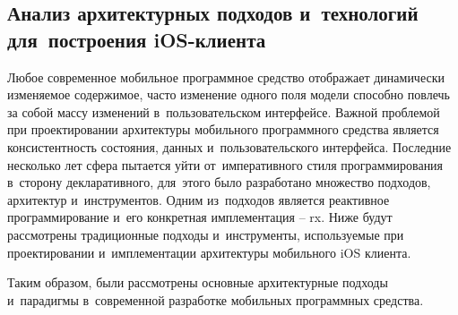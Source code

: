 \subsection{Анализ архитектурных подходов и~технологий для~построения iOS-клиента}
\label{sec:analysis:research:mobArch}

Любое современное мобильное программное средство отображает динамически изменяемое содержимое, часто изменение одного поля модели способно повлечь за собой массу изменений в~пользовательском интерфейсе. Важной проблемой при проектировании архитектуры мобильного программного средства является консистентность состояния, данных и~пользовательского интерфейса. Последние несколько лет сфера пытается уйти от~императивного стиля программирования в~сторону декларативного, для~этого было разработано множество подходов, архитектур и~инструментов. Одним из~подходов является реактивное программирование и~его конкретная имплементация -- \gls{rx}. Ниже будут рассмотрены традиционные подходы и~инструменты, используемые при проектировании и~имплементации архитектуры мобильного iOS клиента.








Таким образом, были рассмотрены основные архитектурные подходы и~парадигмы в~современной разработке мобильных программных средства.